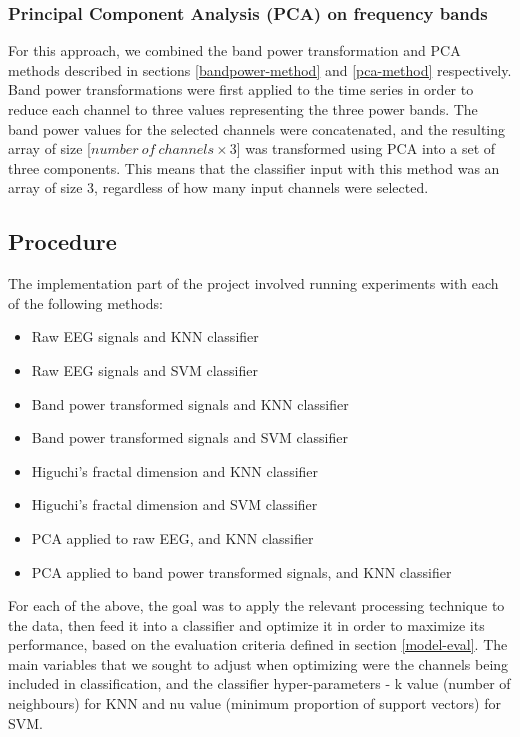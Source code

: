 \documentclass{mpaper}
\begin{document}
\subsubsection{Principal Component Analysis (PCA) on frequency bands}

For this approach, we combined the band power transformation and PCA methods described in sections \ref{bandpower-method} and \ref{pca-method} respectively. Band power transformations were first applied to the time series in order to reduce each channel to three values representing the three power bands. The band power values for the selected channels were concatenated, and the resulting array of size [\( number\ of\ channels \times 3 \)] was transformed using PCA into a set of three components. This means that the classifier input with this method was an array of size 3, regardless of how many input channels were selected.


\subsection{Procedure}
\label{procedure}

The implementation part of the project involved running experiments with each of the following methods:

\begin{itemize}
    \item Raw EEG signals and KNN classifier
    \item Raw EEG signals and SVM classifier
    \item Band power transformed signals and KNN classifier
    \item Band power transformed signals and SVM classifier
    \item Higuchi's fractal dimension and KNN classifier
    \item Higuchi's fractal dimension and SVM classifier
    \item PCA applied to raw EEG, and KNN classifier
    \item PCA applied to band power transformed signals, and KNN classifier
\end{itemize}

For each of the above, the goal was to apply the relevant processing technique to the data, then feed it into a classifier and optimize it in order to maximize its performance, based on the evaluation criteria defined in section \ref{model-eval}. The main variables that we sought to adjust when optimizing were the channels being included in classification, and the classifier hyper-parameters - k value (number of neighbours) for KNN and nu value (minimum proportion of support vectors) for SVM.
\end{document}

